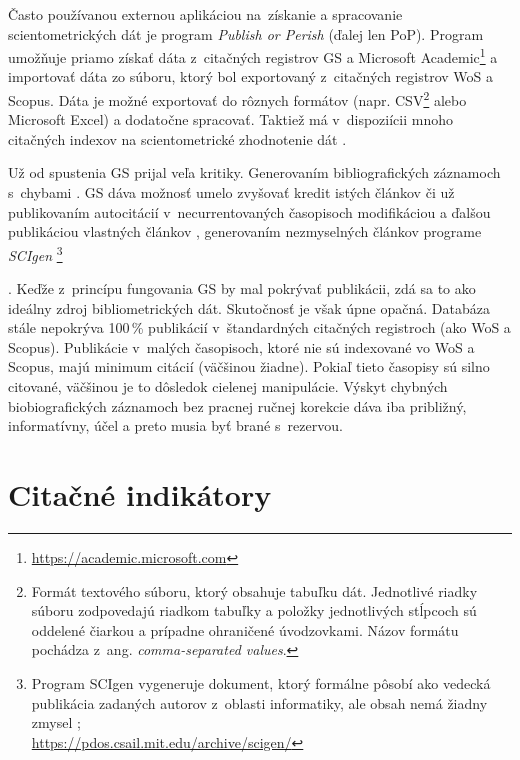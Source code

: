 Často používanou externou aplikáciou na~získanie a spracovanie scientometrických
dát je program \emph{Publish or Perish} (ďalej
len PoP).  Program umožňuje priamo získať dáta z~citačných registrov GS a
Microsoft Academic\footnote{\url{https://academic.microsoft.com}} a importovať
dáta zo súboru, ktorý bol exportovaný z~citačných registrov WoS a Scopus.  Dáta
je možné exportovať do rôznych formátov (napr. CSV\footnote{Formát textového
súboru, ktorý obsahuje tabuľku dát. Jednotlivé riadky súboru zodpovedajú
riadkom tabuľky a položky jednotlivých stĺpcoch sú oddelené čiarkou a prípadne
ohraničené úvodzovkami.  Názov formátu pochádza z~ang. \emph{comma-separated
values}.} alebo Microsoft Excel) a dodatočne spracovať. Taktiež má
v~dispoziícii mnoho citačných indexov na scientometrické zhodnotenie dát
\citep{Harzing2011}.

Už od spustenia GS prijal veľa kritiky.  Generovaním bibliografických záznamoch
s~chybami \citep{Jacso2009,Jacso2010}.  GS dáva možnosť umelo zvyšovať kredit
istých článkov či už publikovaním autocitácií v~necurrentovaných časopisoch
modifikáciou a ďalšou publikáciou vlastných článkov \citep{Beel2010b},
generovaním nezmyselných článkov programe \emph{SCIgen}
\footnote{Program SCIgen vygeneruje dokument, ktorý formálne pôsobí ako
vedecká publikácia zadaných autorov z~oblasti informatiky, ale obsah nemá
žiadny zmysel \citep{Labbe2013};\\\url{https://pdos.csail.mit.edu/archive/scigen/}} 

\citep{Beel2010a}.
Keďže z~princípu fungovania GS by mal pokrývať publikácii, zdá sa to ako
ideálny zdroj bibliometrických dát.  Skutočnosť je však úpne opačná. Databáza
stále nepokrýva 100\,\% publikácií v~štandardných citačných registroch (ako WoS
a Scopus). Publikácie v~malých časopisoch, ktoré nie sú indexované vo WoS a Scopus,
majú minimum citácií (väčšinou žiadne). Pokiaľ tieto časopisy sú silno citované,
väčšinou je to dôsledok cielenej manipulácie.  Výskyt chybných biobiografických
záznamoch bez pracnej ručnej korekcie dáva iba približný, informatívny, účel a
preto musia byť brané s~rezervou.


\section{Citačné indikátory}
\label{sec:indicators}

